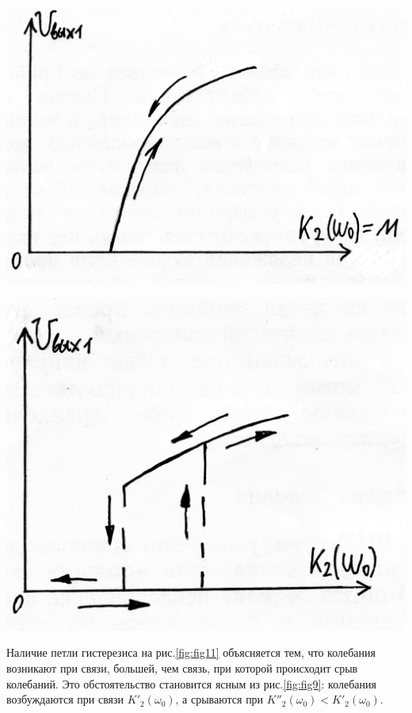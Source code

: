\begin{center}
    \begin{minipage}{0.49\linewidth}
        \includegraphics[width=\linewidth]{circuit/fig10} 
        \label{fig:fig10}
    \end{minipage}
\hfill     
    \begin{minipage}{0.49\linewidth}
        \centering
        \includegraphics[width=\linewidth]{circuit/fig11}  
        \label{fig:fig11}
    \end{minipage} 
\end{center} 

Наличие петли гистерезиса на рис.\ref{fig:fig11} объясняется тем, что колебания возникают при связи, большей, чем связь, при которой происходит срыв колебаний. Это обстоятельство становится ясным из рис.\ref{fig:fig9}: колебания возбуждаются при связи $K'_2(\omega_0)$, а срываются при $K''_2(\omega_0)<K'_2(\omega_0)$.

